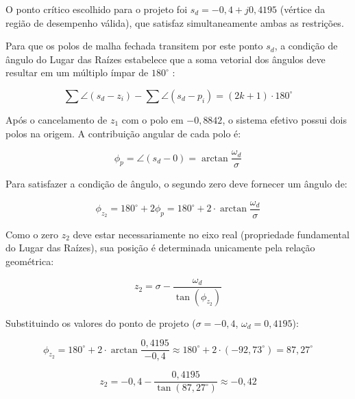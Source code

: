 \documentclass[12pt, a4paper]{article}
\begin{document}
					O ponto crítico escolhido para o projeto foi $s_d = -0{,}4 + j0{,}4195$ (vértice da região de desempenho válida), que satisfaz simultaneamente ambas as restrições.

					Para que os polos de malha fechada transitem por este ponto $s_d$, a condição de ângulo do Lugar das Raízes estabelece que a soma vetorial dos ângulos deve resultar em um múltiplo ímpar de $180^\circ$ \cite{ogata}:

					\begin{equation}
						\sum \angle(s_d - z_i) - \sum \angle(s_d - p_i) = (2k+1) \cdot 180^\circ
					\end{equation}

					Após o cancelamento de $z_1$ com o polo em $-0{,}8842$, o sistema efetivo possui dois polos na origem. A contribuição angular de cada polo é:

					\begin{equation}
						\phi_p = \angle(s_d - 0) = \arctan{\frac{\omega_d}{\sigma}}
					\end{equation}

					Para satisfazer a condição de ângulo, o segundo zero deve fornecer um ângulo de:

					\begin{equation}
						\phi_{z_2} = 180^\circ + 2\phi_p = 180^\circ + 2 \cdot \arctan{\frac{\omega_d}{\sigma}}
					\end{equation}

					Como o zero $z_2$ deve estar necessariamente no eixo real (propriedade fundamental do Lugar das Raízes), sua posição é determinada unicamente pela relação geométrica:

					\begin{equation}
						z_2 = \sigma - \frac{\omega_d}{\tan(\phi_{z_2})}
					\end{equation}

					Substituindo os valores do ponto de projeto ($\sigma = -0{,}4$, $\omega_d = 0{,}4195$):

					\begin{equation}
						\phi_{z_2} = 180^\circ + 2 \cdot \arctan{\frac{0{,}4195}{-0{,}4}} \approx 180^\circ + 2 \cdot \left(-92{,}73^\circ\right) = 87{,}27^\circ
					\end{equation}

					\begin{equation}
						z_2 = -0{,}4 - \frac{0{,}4195}{\tan(87{,}27^\circ)} \approx -0{,}42
					\end{equation}
\end{document}
